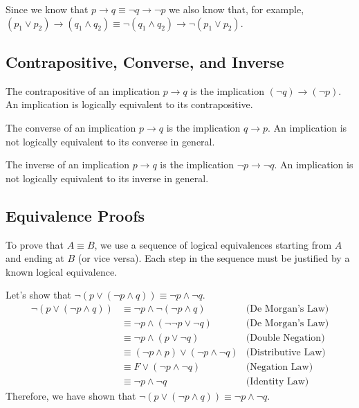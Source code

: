 \begin{eg}
    Since we know that $p \to q \equiv \neg q \to \neg p$ we also know that, for example, $(p_1 \lor p_2) \to (q_1 \land q_2) \equiv \neg (q_1 \land q_2) \to \neg (p_1 \lor p_2)$.
\end{eg}

\subsection{Contrapositive, Converse, and Inverse}
\begin{definition}[Contrapositive]
    The contrapositive of an implication \(p \to q\) is the implication \((\neg q) \to (\neg p)\). An implication is logically equivalent to its contrapositive.
\end{definition}
\begin{definition}[Converse]
    The converse of an implication \(p \to q\) is the implication \(q \to p\). An implication is not logically equivalent to its converse in general.
\end{definition}
\begin{definition}[Inverse]
    The inverse of an implication \(p \to q\) is the implication \(\neg p \to \neg q\). An implication is not logically equivalent to its inverse in general.
\end{definition}

\subsection{Equivalence Proofs}
To prove that $A \equiv B$, we use a sequence of logical equivalences starting from $A$ and ending at $B$ (or vice versa). Each step in the sequence must be justified by a known logical equivalence.
\begin{eg}
    Let's show that $\neg (p \lor (\neg p \land q)) \equiv \neg p \land \neg q$.
    \begin{align*}
        \neg (p \lor (\neg p \land q)) &\equiv \neg p \land \neg (\neg p \land q) &\text{(De Morgan's Law)} \\
        &\equiv \neg p \land (\neg \neg p \lor \neg q) &\text{(De Morgan's Law)} \\
        &\equiv \neg p \land (p \lor \neg q) &\text{(Double Negation)} \\
        &\equiv (\neg p \land p) \lor (\neg p \land \neg q) &\text{(Distributive Law)} \\
        &\equiv F \lor (\neg p \land \neg q) &\text{(Negation Law)} \\
        &\equiv \neg p \land \neg q &\text{(Identity Law)}
    \end{align*}
    Therefore, we have shown that $\neg (p \lor (\neg p \land q)) \equiv \neg p \land \neg q$.
\end{eg}

